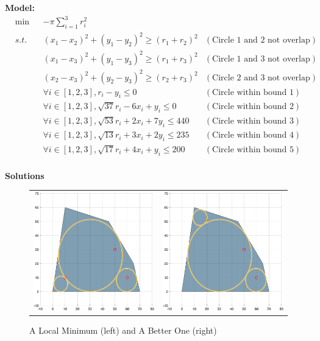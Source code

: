 \textbf{Model:}
\begin{align*}
&\min&& -\pi \sum_{i=1}^3 r_i^2 \\
&s.t.
 && (x_1 - x_2)^2 + (y_1 - y_2)^2 \geq (r_1 + r_2)^2 &(\text{Circle 1 and 2 not overlap})\\
&&& (x_1 - x_3)^2 + (y_1 - y_3)^2 \geq (r_1 + r_3)^2 &(\text{Circle 1 and 3 not overlap})\\
&&& (x_2 - x_3)^2 + (y_2 - y_3)^2 \geq (r_2 + r_3)^2 &(\text{Circle 2 and 3 not overlap}) \\
&&& \forall i \in [1,2,3], r_i - y_i \leq 0 &(\text{Circle within bound 1}) \\
&&& \forall i \in [1,2,3], \sqrt{37}r_i - 6x_i + y_i \leq 0 & (\text{Circle within bound 2}) \\
&&& \forall i \in [1,2,3], \sqrt{53}r_i + 2x_i + 7y_i \leq 440 & (\text{Circle within bound 3}) \\
&&& \forall i \in [1,2,3], \sqrt{13}r_i + 3x_i + 2y_i \leq 235 & (\text{Circle within bound 4}) \\
&&& \forall i \in [1,2,3], \sqrt{17}r_i + 4x_i + y_i \leq 200 & (\text{Circle within bound 5}) \\
\end{align*}

\textbf{Solutions}\par

\begin{figure}
    \centering
    \begin{tabular}{c  c}
        \includegraphics[width=0.4\linewidth]{hw2/hw2-prob1-plot1.png} &
        \includegraphics[width=0.4\linewidth]{hw2/hw2-prob1-plot2.png}
    \end{tabular}
    \caption{A Local Minimum (left) and A Better One (right)}
    \label{fig:circle_better_minima_cmp}
\end{figure}

